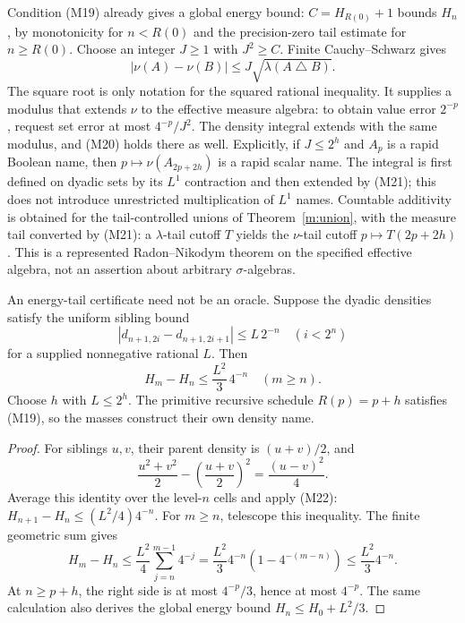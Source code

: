 Condition (M19) already gives a global energy bound:
\(C=H_{R(0)}+1\) bounds \(H_n\), by monotonicity for \(n<R(0)\) and
the precision-zero tail estimate for \(n\ge R(0)\).
Choose an integer \(J\ge1\) with \(J^2\ge C\).
Finite Cauchy--Schwarz gives
\[
 |\nu(A)-\nu(B)|
 \le J\sqrt{\lambda(A\mathbin{\triangle}B)}.
 \tag{M21}
\]
The square root is only notation for the squared rational inequality.
It supplies a modulus that extends \(\nu\) to the effective measure algebra:
to obtain value error \(2^{-p}\), request set error at most
\(4^{-p}/J^2\).  The density integral extends with the same modulus, and
(M20) holds there as well.  Explicitly, if \(J\le2^h\) and \(A_p\) is a
rapid Boolean name, then \(p\mapsto\nu(A_{2p+2h})\) is a rapid scalar name.
The integral is first defined on dyadic sets by its \(L^1\) contraction and
then extended by (M21); this does not introduce unrestricted multiplication
of \(L^1\) names.  Countable additivity is obtained for the
tail-controlled unions of Theorem~\ref{m:union}, with the measure tail
converted by (M21): a \(\lambda\)-tail cutoff \(T\) yields the
\(\nu\)-tail cutoff \(p\mapsto T(2p+2h)\).
This is a represented Radon--Nikodym theorem on the
specified effective algebra, not an assertion about arbitrary
\(\sigma\)-algebras.

\begin{theorem}\label{m:oscillation}
An energy-tail certificate need not be an oracle.  Suppose the dyadic
densities satisfy the uniform sibling bound
\[
 |d_{n+1,2i}-d_{n+1,2i+1}|\le L\,2^{-n}
 \quad(i<2^n)
 \tag{M22}
\]
for a supplied nonnegative rational \(L\).  Then
\[
 H_m-H_n\le\frac{L^2}{3}\,4^{-n}\quad(m\ge n).
 \tag{M23}
\]
Choose \(h\) with \(L\le2^h\).  The primitive recursive schedule
\(R(p)=p+h\) satisfies (M19), so the masses construct their own density name.
\end{theorem}

\begin{proof}
For siblings \(u,v\), their parent density is \((u+v)/2\), and
\[
 \frac{u^2+v^2}{2}-\left(\frac{u+v}{2}\right)^2
   =\frac{(u-v)^2}{4}.
 \]
Average this identity over the level-\(n\) cells and apply (M22):
\(H_{n+1}-H_n\le(L^2/4)4^{-n}\).
For \(m\ge n\), telescope this inequality.  The finite geometric sum gives
\[
 H_m-H_n
 \le\frac{L^2}{4}\sum_{j=n}^{m-1}4^{-j}
 =\frac{L^2}{3}4^{-n}(1-4^{-(m-n)})
 \le\frac{L^2}{3}4^{-n}.
 \]
At \(n\ge p+h\), the right side is at most \(4^{-p}/3\), hence at most
\(4^{-p}\).  The same calculation also derives the global energy bound
\(H_n\le H_0+L^2/3\).
\end{proof}

